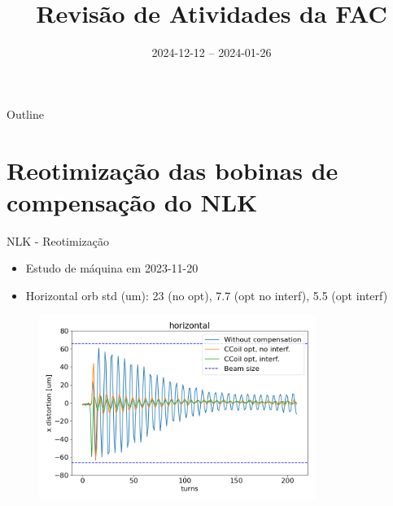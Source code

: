 \documentclass{beamer}					  %
\title{Revisão de Atividades da FAC}	%
\institute{LNLS.DAC.FAC}				%
\date{2024-12-12 -- 2024-01-26}			%
\begin{document}
\begin{frame}
  \titlepage
  \href{https://github.com/lnls-fac/doc-review-dac-fac}{}
  \href{https://www.overleaf.com/read/sbdjxtzfchrm}{}
\end{frame}

\begin{frame}{Outline}
  \tableofcontents
\end{frame}


\section{Reotimização das bobinas de compensação do NLK}

\begin{frame}{NLK - Reotimização}
    \scriptsize{\begin{itemize}
    		\item Estudo de máquina em 2023-11-20
            \item Horizontal orb std (um): 23 (no opt), 7.7 (opt no interf),  5.5 (opt interf)
    \end{itemize}}
    \begin{figure}[H]
        	\centering
            \includegraphics[width=0.8\textwidth]{2024-01-26/figures/horizontal_nlk_distortion_interference.png}
            \label{fig:bba}
    \end{figure} 
\end{frame}
\end{document}

